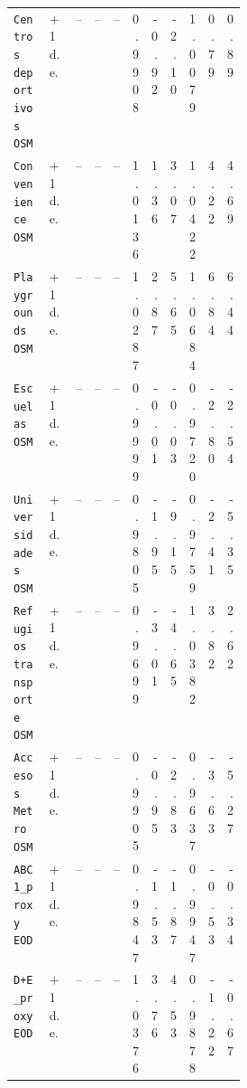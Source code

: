 \begin{landscape}
\begin{longtable}{p{0.18\linewidth}p{0.12\linewidth}rrrrrrrrr}
\texttt{Centros deportivos OSM} & +1 d.e. & -- & -- & -- & 0.9908 & -0.92 & -2.10 & 1.0079 & 0.79 & 0.89 \\
\texttt{Convenience OSM} & +1 d.e. & -- & -- & -- & 1.0136 & 1.36 & 3.07 & 1.0422 & 4.22 & 4.69 \\
\texttt{Playgrounds OSM} & +1 d.e. & -- & -- & -- & 1.0287 & 2.87 & 5.65 & 1.0684 & 6.84 & 6.44 \\
\texttt{Escuelas OSM} & +1 d.e. & -- & -- & -- & 0.9999 & -0.01 & -0.03 & 0.9720 & -2.80 & -2.54 \\
\texttt{Universidades OSM} & +1 d.e. & -- & -- & -- & 0.9805 & -1.95 & -9.15 & 0.9759 & -2.41 & -5.35 \\
\texttt{Refugios transporte OSM} & +1 d.e. & -- & -- & -- & 0.9699 & -3.01 & -4.65 & 1.0382 & 3.82 & 2.62 \\
\texttt{Accesos Metro OSM} & +1 d.e. & -- & -- & -- & 0.9905 & -0.95 & -2.83 & 0.9637 & -3.63 & -5.27 \\
\texttt{ABC1\_proxy EOD} & +1 d.e. & -- & -- & -- & 0.9847 & -1.53 & -1.87 & 0.9947 & -0.53 & -0.34 \\
\texttt{D+E\_proxy EOD} & +1 d.e. & -- & -- & -- & 1.0376 & 3.76 & 4.53 & 0.9878 & -1.22 & -0.67 \\

\end{longtable}
\end{landscape}

